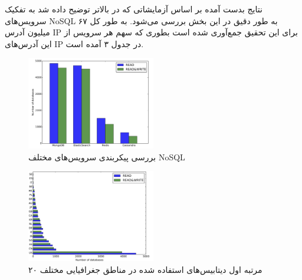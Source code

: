 \documentclass[10pt, a4paper]{article}
\begin{document}
\newpage

نتایج بدست آمده بر اساس آزمایشاتی که در بالاتر توضیح داده شد به تفکیک سرویس‌های
NoSQL به طور دقیق در این بخش بررسی می‌شود. به طور کل ۶۷ میلیون آدرس IP برای این
تحقیق جمع‌آوری شده است بطوری که سهم هر سرویس از این آدرس‌های IP در جدول ۳ آمده
است.

\begin{LTR}
    \begin{table}[h]
        \centering
        \begin{RTL}
            \caption{آدرس‌های IP یافت شده بین بازه اکتبر ۲۰۱۹ تا مارچ ۲۰۲۰}
        \end{RTL}
    \end{table}
\end{LTR}

\begin{figure}
    \centering
    \includegraphics[width=0.5\textwidth]{res/a.png}
    \caption{بررسی پیکربندی سرویس‌های مختلف NoSQL}
    \label{fig: diagram}
\end{figure}

\begin{figure}
    \centering
    \includegraphics[width=0.5\textwidth]{res/fig3.png}
    \caption{۲۰ مرتبه اول دیتابیس‌‌های استفاده شده در مناطق جغرافیایی مختلف}
    \label{fig: diagram}
\end{figure}
\end{document}
